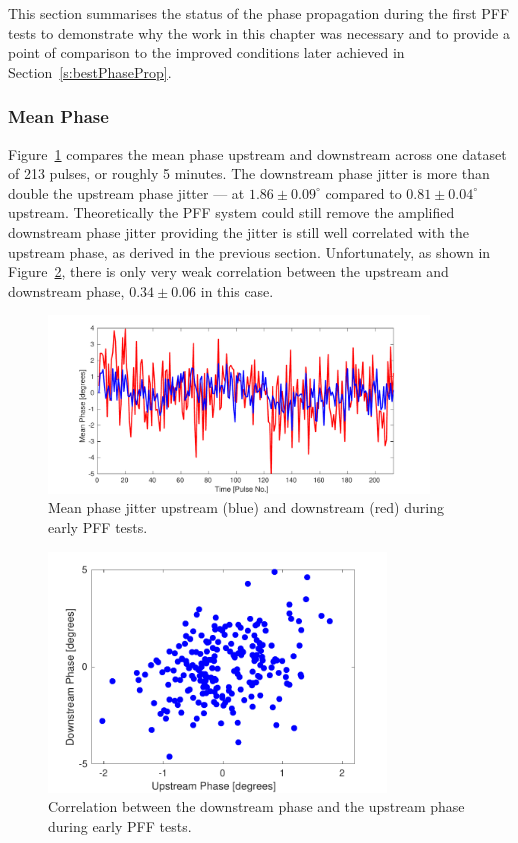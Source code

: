 This section summarises the status of the phase propagation during the first PFF tests to demonstrate why the work in this chapter was necessary and to provide a point of comparison to the improved conditions later achieved in Section~\ref{s:bestPhaseProp}.

\subsubsection{Mean Phase}

Figure~\ref{f:origMeanPhJit} compares the mean phase upstream and downstream across one dataset of 213 pulses, or roughly 5 minutes. The downstream phase jitter is more than double the upstream phase jitter --- at \(1.86\pm0.09^\circ\) compared to \(0.81\pm0.04^\circ\) upstream. Theoretically the PFF system could still remove the amplified downstream phase jitter providing the jitter is still well correlated with the upstream phase, as derived in the previous section. Unfortunately, as shown in Figure~\ref{f:origUpVsDown}, there is only very weak correlation between the upstream and downstream phase, \(0.34\pm0.06\) in this case.

\begin{figure}
  \centering
  \includegraphics[width=0.9\textwidth]{Figures/propagation/origMeanPhJit}
  \caption{Mean phase jitter upstream (blue) and downstream (red) during early PFF tests.}
  \label{f:origMeanPhJit}
\end{figure}

\begin{figure}
  \centering
  \includegraphics[width=0.8\textwidth]{Figures/propagation/origUpVsDown}
  \caption{Correlation between the downstream phase and the upstream phase during early PFF tests.}
  \label{f:origUpVsDown}
\end{figure}

